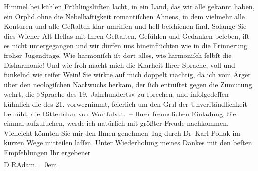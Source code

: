 \begin{ledgroupsized}[t]{13cm}
                    Himmel bei kühlen Frühlingslüften lacht, in ein Land, das wir alle gekannt
                    haben, ein Orplid ohne die Nebelhaftigkeit romantiſchen Ahnens, in dem vielmehr
                    alle Konturen und alle Geſtalten klar umriſſen und hell beſchienen ſind. Solange
                    Sie dies Wiener Alt-Hellas mit Ihren Geſtalten, Gefühlen und Gedanken beleben, iſt es
                    nicht untergegangen und wir dürfen uns hineinflüchten wie in die Erinnerung
                    froher Jugendtage. Wie harmoniſch iſt dort alles, wie harmoniſch ſelbſt die
                    Disharmonie! Und wie froh macht mich die Klarheit Ihrer {\pb}Sprache, voll und funkelnd wie
                    reifer Wein! Sie wirkte auf mich doppelt mächtig, da ich vom Ärger über den
                    neologiſchen Nachwuchs herkam, der ſich entrüſtet gegen die Zumutung wehrt, die
                    »Sprache des 19. Jahrhunderts« zu ſprechen, und infolgedeſſen kühnlich die des
                    21. vorwegnimmt, feierlich um den Gral der Unverſtändlichkeit bemüht, die
                    Ritterſchar von Wortſalvat. –\pend
           \pstart
           Ihrer freundlichen Einladung, Sie einmal aufzuſuchen, werde ich natürlich mit
                    größter Freude nachkommen. Vielleicht könnten Sie mir den Ihnen genehmen Tag
                    durch Dr Karl Pollak im kurzen Wege
                    mitteilen laſſen.\pend
           \pstart
           {\pb}Unter Wiederholung meines Dankes mit
                    den beſten Empfehlungen\pend
           \pstart
           Ihr ergebener{\\[\baselineskip]}\spacefill\mbox{D\textsuperscript{r}RAdam.}\pend
           \leftskip=0em{}\endnumbering{}\end{ledgroupsized}  \newcommand{\dateiname}{L02485}\newcommand{\titel}{Robert Adam an Arthur Schnitzler, 1. 5. 1927}\newcommand{\editorInnen}{Martin Anton Müller und Gerd-Hermann Susen}
      